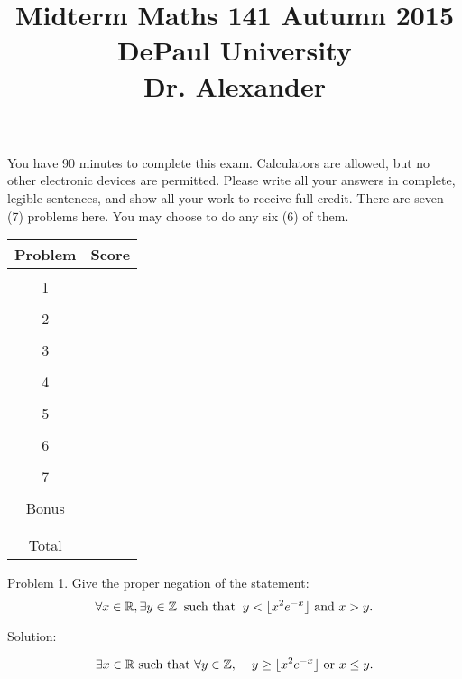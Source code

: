\documentclass[16 pt]{amsart}
\theoremstyle{definition}
\theoremstyle{remark}
\numberwithin{equation}{subsection}
\newcommand{\R}{\mathbb{R}}
\newcommand{\Z}{\mathbb{Z}}
\begin{document}
\title{Midterm Maths 141 Autumn 2015 \\ DePaul University\\Dr. Alexander}
\maketitle
You have 90 minutes to complete this exam.  Calculators are allowed, but no other electronic devices are permitted.  Please write all your answers in complete, legible sentences, and show all your work to receive full credit.  There are seven (7) problems here.  You may choose to do any six (6) of them.  
\vspace{1in}


\begin{center}
  \begin{tabular}{ c | c }
    Problem & Score\\
    \hline
    &\\
    1&\\
    &\\
    2&\\
    &\\
    3&\\
    &\\
    4&\\
    &\\
    5&\\
    &\\
    6&\\
    &\\
    7&\\
    &\\
    Bonus&\\
    &\\
    \hline 
    &\\    
    Total& 
 \end{tabular}
\end{center}

\newpage 
Problem 1. Give the proper negation of the statement:
\[
\forall x\in\R, \exists y\in\Z \hspace{2mm} \text{such that} \hspace{2mm} y<\lfloor x^{2}e^{-x}\rfloor \text{ and } x>y.
\]

\vspace{1in}

Solution:

\[
\exists x\in\R \text{ such that } \forall y\in\Z, \hspace{2mm}  \hspace{2mm} y\ge \lfloor x^{2}e^{-x}\rfloor \text{ or } x\le y.
\]
\end{document}
